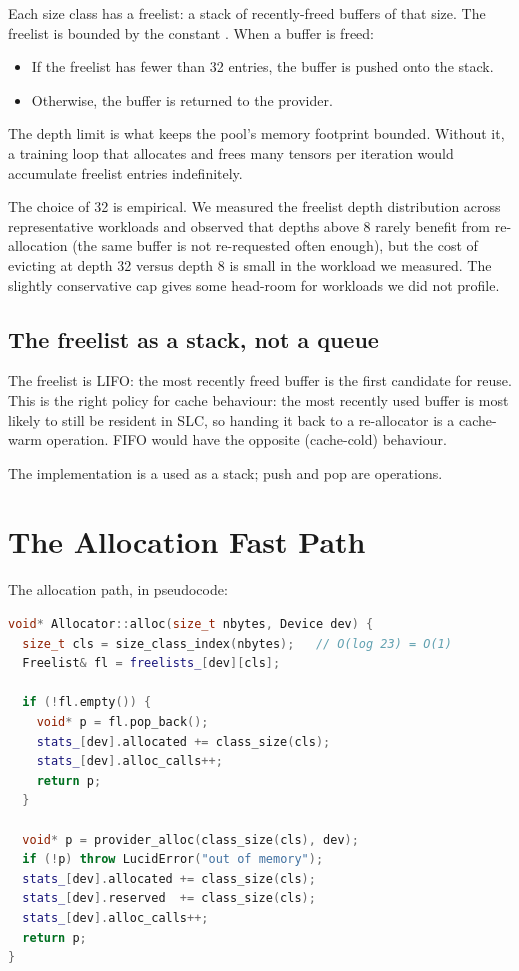 Each size class has a freelist: a stack of recently-freed buffers
of that size. The freelist is bounded by the constant
. When a buffer is freed:

\begin{itemize}
  \item If the freelist has fewer than 32 entries, the buffer is
    pushed onto the stack.
  \item Otherwise, the buffer is returned to the provider.
\end{itemize}

The depth limit is what keeps the pool's memory footprint bounded.
Without it, a training loop that allocates and frees many tensors
per iteration would accumulate freelist entries indefinitely.

The choice of 32 is empirical. We measured the freelist depth
distribution across representative workloads and observed that
depths above 8 rarely benefit from re-allocation (the same buffer
is not re-requested often enough), but the cost of evicting at
depth 32 versus depth 8 is small in the workload we measured. The
slightly conservative cap gives some head-room for workloads we did
not profile.

\subsection{The freelist as a stack, not a queue}
\label{ssec:allocator:lifo}

The freelist is LIFO: the most recently freed buffer is the first
candidate for reuse. This is the right policy for cache behaviour:
the most recently used buffer is most likely to still be resident
in SLC, so handing it back to a re-allocator is a cache-warm
operation. FIFO would have the opposite (cache-cold) behaviour.

The implementation is a  used as a stack; push
and pop are  operations.

\section{The Allocation Fast Path}
\label{sec:allocator:fast_path}

The allocation path, in pseudocode:

\begin{lstlisting}[style=lucidcpp,language=C++]
void* Allocator::alloc(size_t nbytes, Device dev) {
  size_t cls = size_class_index(nbytes);   // O(log 23) = O(1)
  Freelist& fl = freelists_[dev][cls];

  if (!fl.empty()) {
    void* p = fl.pop_back();
    stats_[dev].allocated += class_size(cls);
    stats_[dev].alloc_calls++;
    return p;
  }

  void* p = provider_alloc(class_size(cls), dev);
  if (!p) throw LucidError("out of memory");
  stats_[dev].allocated += class_size(cls);
  stats_[dev].reserved  += class_size(cls);
  stats_[dev].alloc_calls++;
  return p;
}
\end{lstlisting}

